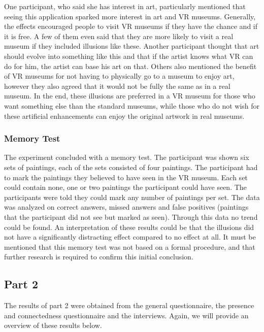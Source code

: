 \documentclass[a4paper]{article}
\begin{document}
One participant, who said she has interest in art, particularly mentioned that seeing this application sparked more interest in art and VR museums. Generally, the effects encouraged people to visit VR museums if they have the chance and if it is free. A few of them even said that they are more likely to visit a real museum if they included illusions like these. Another participant thought that art should evolve into something like this and that if the artist knows what VR can do for him, the artist can base his art on that. Others also mentioned the benefit of VR museums for not having to physically go to a museum to enjoy art, however they also agreed that it would not be fully the same as in a real museum. In the end, these illusions are preferred in a VR museum for those who want something else than the standard museums, while those who do not wish for these artificial enhancements can enjoy the original artwork in real museums. 
  


\subsubsection{Memory Test}
The experiment concluded with a memory test. The participant was shown six sets of paintings, each of the sets consisted of four paintings. The participant had to mark the paintings they believed to have seen in the VR museum. Each set could contain none, one or two paintings the participant could have seen. The participants were told they could mark any number of paintings per set. The data was analyzed on correct answers, missed answers and false positives (paintings that the participant did not see but marked as seen). Through this data no trend could be found. An interpretation of these results could be that the illusions did not have a significantly distracting effect compared to no effect at all. It must be mentioned that this memory test was not based on a formal procedure, and that further research is required to confirm this initial conclusion.


\subsection{Part 2}

The results of part 2 were obtained from the general questionnaire, the presence and connectedness questionnaire and the interviews. Again, we will provide an overview of these results below.
\end{document}
